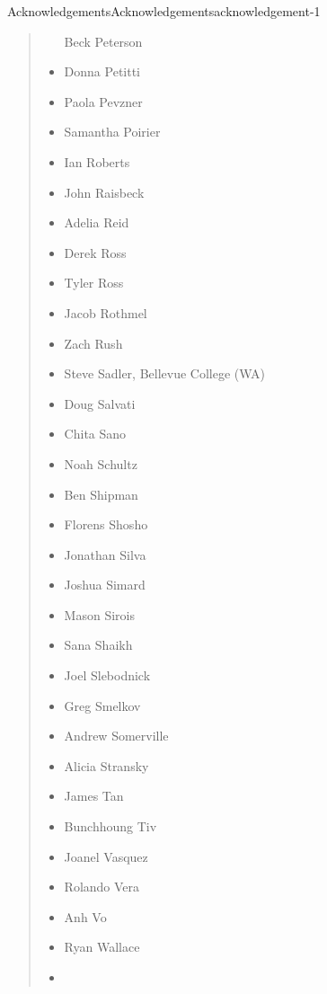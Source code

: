 \documentclass[twoside,10pt,]{book}
\numberwithin{equation}{section}
\begin{document}
\begin{acknowledgement}{Acknowledgements}{}{Acknowledgements}{}{}{acknowledgement-1}
\begin{quote}
\begin{multicols}{2}
\begin{itemize}[label=\textbullet]
Beck Peterson%
\item{}\hypertarget{p-105}{}%
Donna Petitti%
\item{}\hypertarget{p-106}{}%
Paola Pevzner%
\item{}\hypertarget{p-107}{}%
Samantha Poirier%
\item{}\hypertarget{p-108}{}%
Ian Roberts%
\item{}\hypertarget{p-109}{}%
John Raisbeck%
\item{}\hypertarget{p-110}{}%
Adelia Reid%
\item{}\hypertarget{p-111}{}%
Derek Ross%
\item{}\hypertarget{p-112}{}%
Tyler Ross%
\item{}\hypertarget{p-113}{}%
Jacob Rothmel%
\item{}\hypertarget{p-114}{}%
Zach Rush%
\item{}\hypertarget{p-115}{}%
Steve Sadler, Bellevue College (WA)%
\item{}\hypertarget{p-116}{}%
Doug Salvati%
\item{}\hypertarget{p-117}{}%
Chita Sano%
\item{}\hypertarget{p-118}{}%
Noah Schultz%
\item{}\hypertarget{p-119}{}%
Ben Shipman%
\item{}\hypertarget{p-120}{}%
Florens Shosho%
\item{}\hypertarget{p-121}{}%
Jonathan Silva%
\item{}\hypertarget{p-122}{}%
Joshua Simard%
\item{}\hypertarget{p-123}{}%
Mason Sirois%
\item{}\hypertarget{p-124}{}%
Sana Shaikh%
\item{}\hypertarget{p-125}{}%
Joel Slebodnick%
\item{}\hypertarget{p-126}{}%
Greg Smelkov%
\item{}\hypertarget{p-127}{}%
Andrew Somerville%
\item{}\hypertarget{p-128}{}%
Alicia Stransky%
\item{}\hypertarget{p-129}{}%
James Tan%
\item{}\hypertarget{p-130}{}%
Bunchhoung Tiv%
\item{}\hypertarget{p-131}{}%
Joanel Vasquez%
\item{}\hypertarget{p-132}{}%
Rolando Vera%
\item{}\hypertarget{p-133}{}%
Anh Vo%
\item{}\hypertarget{p-134}{}%
Ryan Wallace%
\item{}\hypertarget{p-135}{}%

\end{itemize}
\end{multicols}
\end{quote}
\end{acknowledgement}
\end{document}
